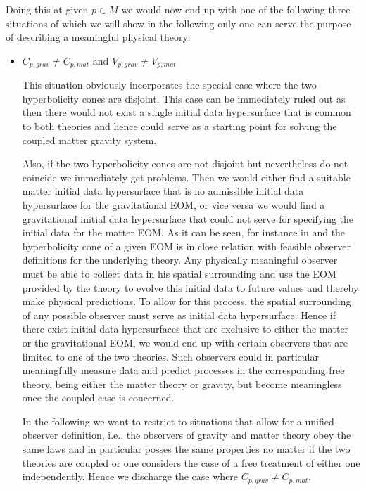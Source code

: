 \documentclass[a4paper,12pt, DIV=14, BCOR=5mm, twoside, headsepline, numbers=noenddot]{scrbook}
\begin{document}
Doing this at given $p \in M$ we would now end up with one of the following three situations of which we will show in the following only one can serve the purpose of describing a meaningful physical theory:
\begin{itemize}
    \item $C_{p,grav} \neq C_{p,mat}$ and $V_{p,grav} \neq V_{p,mat}$
    
This situation obviously incorporates the special case where the two hyperbolicity cones are disjoint. This case can be immediately ruled out as then there would not exist a single initial data hypersurface that is common to both theories and hence could serve as a starting point for solving the coupled matter gravity system.   

Also, if the two hyperbolicity cones are not disjoint but nevertheless do not coincide we immediately get problems. Then we would either find a suitable matter initial data hypersurface that is no admissible initial data hypersurface for the gravitational EOM, or vice versa we would find a gravitational initial data hypersurface that could not serve for specifying the initial data for the matter EOM. As it can be seen, for instance in \cite{Rivera} and \cite{2011PhRvD..83d4047R} the hyperbolicity cone of a given EOM is in close relation with feasible observer definitions for the underlying theory. Any physically meaningful observer must be able to collect data in his spatial surrounding and use the EOM provided by the theory to evolve this initial data to future values and thereby make physical predictions. To allow for this process, the spatial surrounding of any possible observer must serve as initial data hypersurface. Hence if there exist initial data hypersurfaces that are exclusive to either the matter or the gravitational EOM, we would end up with certain observers that are limited to one of the two theories. Such observers could in particular meaningfully measure data and predict processes in the corresponding free theory, being either the matter theory or gravity, but become meaningless once the coupled case is concerned.

In the following we want to restrict to situations that allow for a unified observer definition, i.e., the observers of gravity and matter theory obey the same laws and in particular posses the same properties no matter if the two theories are coupled or one considers the case of a free treatment of either one independently. Hence we discharge the case where $C_{p,grav} \neq C_{p,mat}$.


\end{itemize}
\end{document}
